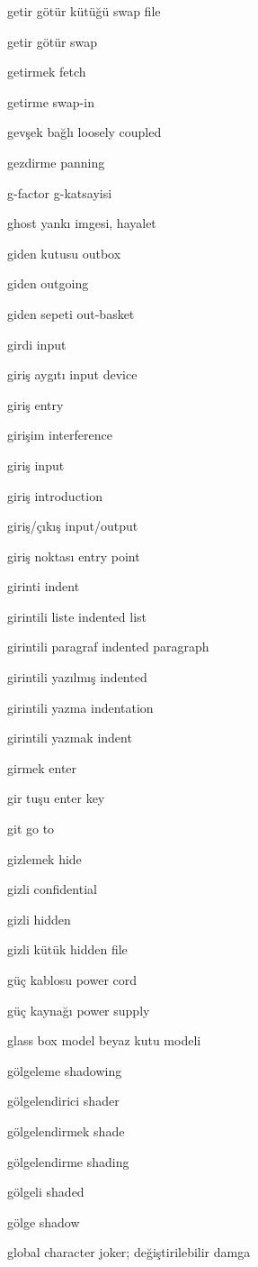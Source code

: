 \documentclass[12pt,fleqn]{article}\usepackage{../../common}
\begin{document}
getir götür kütüğü swap file

getir götür swap

getirmek fetch

getirme swap-in

gevşek bağlı loosely coupled

gezdirme panning

g-factor g-katsayisi

ghost yankı imgesi, hayalet

giden kutusu outbox

giden outgoing

giden sepeti out-basket

girdi input

giriş aygıtı input device

giriş entry

girişim interference

giriş input

giriş introduction

giriş/çıkış input/output

giriş noktası entry point

girinti indent

girintili liste indented list

girintili paragraf indented paragraph

girintili yazılmış indented

girintili yazma indentation

girintili yazmak indent

girmek enter

gir tuşu enter key

git go to

gizlemek hide

gizli confidential

gizli hidden

gizli kütük hidden file

güç kablosu power cord

güç kaynağı power supply

glass box model beyaz kutu modeli

gölgeleme shadowing

gölgelendirici shader

gölgelendirmek shade

gölgelendirme shading

gölgeli shaded

gölge shadow

global character joker; değiştirilebilir damga
\end{document}
